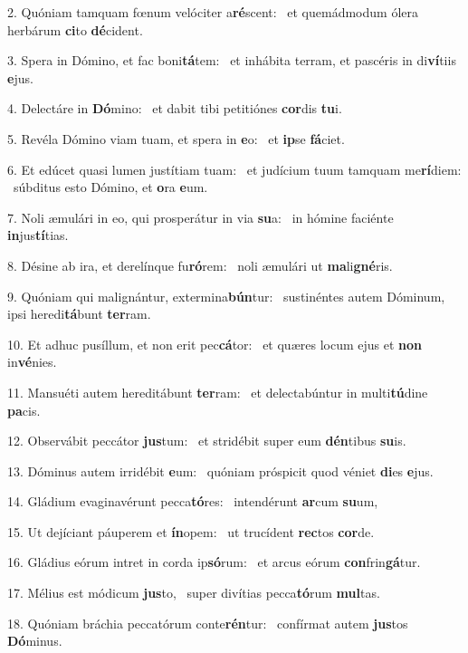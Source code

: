 2. Quóniam tamquam fœnum velóciter a\textbf{ré}scent: \ast\  et quemádmodum ólera herbárum \textbf{ci}to \textbf{dé}cident.\

3. Spera in Dómino, et fac boni\textbf{tá}tem: \ast\  et inhábita terram, et pascéris in di\textbf{ví}tiis \textbf{e}jus.\

4. Delectáre in \textbf{Dó}mino: \ast\  et dabit tibi petitiónes \textbf{cor}dis \textbf{tu}i.\

5. Revéla Dómino viam tuam, et spera in \textbf{e}o: \ast\  et \textbf{ip}se \textbf{fá}ciet.\

6. Et edúcet quasi lumen justítiam tuam: \dag\  et judícium tuum tamquam me\textbf{rí}diem: \ast\  súbditus esto Dómino, et \textbf{o}ra \textbf{e}um.\

7. Noli æmulári in eo, qui prosperátur in via \textbf{su}a: \ast\  in hómine faciénte \textbf{in}jus\textbf{tí}tias.\

8. Désine ab ira, et derelínque fu\textbf{ró}rem: \ast\  noli æmulári ut \textbf{ma}li\textbf{gné}ris.\

9. Quóniam qui malignántur, extermina\textbf{bún}tur: \ast\  sustinéntes autem Dóminum, ipsi heredi\textbf{tá}bunt \textbf{ter}ram.\

10. Et adhuc pusíllum, et non erit pec\textbf{cá}tor: \ast\  et quæres locum ejus et \textbf{non} in\textbf{vé}nies.\

11. Mansuéti autem hereditábunt \textbf{ter}ram: \ast\  et delectabúntur in multi\textbf{tú}dine \textbf{pa}cis.\

12. Observábit peccátor \textbf{jus}tum: \ast\  et stridébit super eum \textbf{dén}tibus \textbf{su}is.\

13. Dóminus autem irridébit \textbf{e}um: \ast\  quóniam próspicit quod véniet \textbf{di}es \textbf{e}jus.\

14. Gládium evaginavérunt pecca\textbf{tó}res: \ast\  intendérunt \textbf{ar}cum \textbf{su}um,\

15. Ut dejíciant páuperem et \textbf{ín}opem: \ast\  ut trucídent \textbf{rec}tos \textbf{cor}de.\

16. Gládius eórum intret in corda ip\textbf{só}rum: \ast\  et arcus eórum \textbf{con}frin\textbf{gá}tur.\

17. Mélius est módicum \textbf{jus}to, \ast\  super divítias pecca\textbf{tó}rum \textbf{mul}tas.\

18. Quóniam bráchia peccatórum conte\textbf{rén}tur: \ast\  confírmat autem \textbf{jus}tos \textbf{Dó}minus.\

